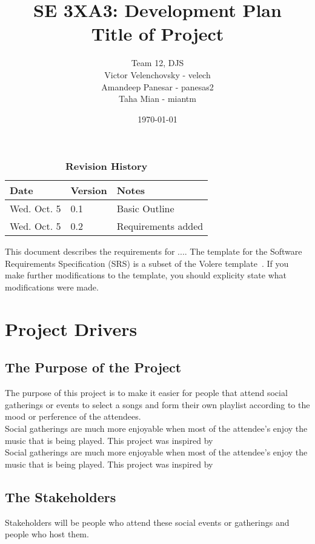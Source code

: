 \documentclass[12pt, titlepage]{article}
\title{SE 3XA3: Development Plan\\Title of Project}
\author{Team 12, DJS
	\\ Victor Velenchovsky - velech
	\\ Amandeep Panesar - panesas2
	\\ Taha Mian - miantm
}
\date{\today}
\begin{document}
\maketitle

\tableofcontents
\listoftables
\listoffigures

\begin{table}[bp]
\caption{\bf Revision History}
\begin{tabularx}{\textwidth}{p{3cm}p{2cm}X}
\toprule {\bf Date} & {\bf Version} & {\bf Notes}\\
\midrule
Wed. Oct. 5 & 0.1 & Basic Outline\\
Wed. Oct. 5 & 0.2 & Requirements added\\
\bottomrule
\end{tabularx}
\end{table}

\newpage


This document describes the requirements for ....  The template for the Software
Requirements Specification (SRS) is a subset of the Volere
template~\citep{RobertsonAndRobertson2012}.  If you make further modifications
to the template, you should explicity state what modifications were made.

\section{Project Drivers}

\subsection{The Purpose of the Project}
The purpose of this project is to make it easier for people that attend social
gatherings or events to select a songs and form their own playlist according to
the mood or perference of the attendees. \\

Social gatherings are much more enjoyable when most of the attendee's enjoy
the music that is being played. This project was inspired by \\

Social gatherings are much more enjoyable when most of the attendee's enjoy
the music that is being played. This project was inspired by

\subsection{The Stakeholders}
Stakeholders will be people who attend these social events or gatherings and
people who host them. \\
\end{document}
